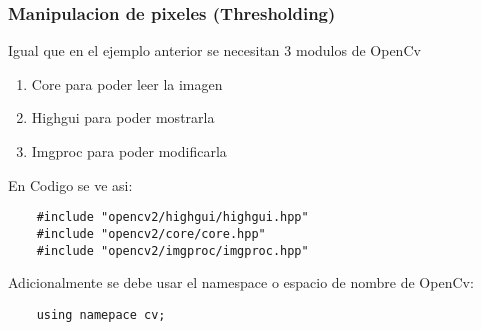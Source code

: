 \begin{frame}[fragile]
   \frametitle{Manipulacion de pixeles (Thresholding)}

        Igual que en el ejemplo anterior se necesitan 3 modulos de OpenCv

        \begin{enumerate}
            \item Core para poder leer la imagen
            \item Highgui para poder mostrarla
            \item Imgproc para poder modificarla
        \end{enumerate}

        \vspace{1cm}

        En Codigo se ve asi:

        \begin{lstlisting}
    #include "opencv2/highgui/highgui.hpp"
    #include "opencv2/core/core.hpp"
    #include "opencv2/imgproc/imgproc.hpp"
        \end{lstlisting}

        Adicionalmente se debe usar el namespace o espacio de nombre de OpenCv:

        \begin{lstlisting}
    using namepace cv;
        \end{lstlisting}
\end{frame}
